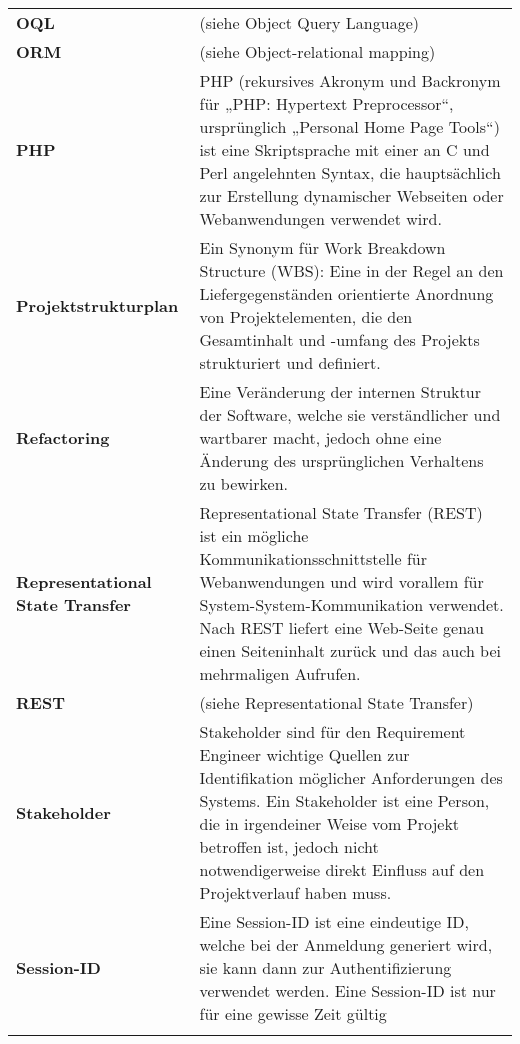 \begin{longtable}{>{\raggedright}m{3cm}m{11cm}}
	\textbf{OQL}&
	(siehe Object Query Language)\\ \addlinespace

	\textbf{ORM}&
	(siehe Object-relational mapping)\\ \addlinespace

	\textbf{PHP}&
	PHP (rekursives Akronym und Backronym für „PHP: Hypertext Preprocessor“, ursprünglich „Personal Home Page Tools“) ist eine Skriptsprache mit einer an C und Perl angelehnten Syntax, die hauptsächlich zur Erstellung dynamischer Webseiten oder Webanwendungen verwendet wird.\cite{wiki_php}\\ \addlinespace	

	\textbf{Projektstrukturplan}&
	Ein Synonym für Work Breakdown Structure (WBS): Eine in der Regel an den Liefergegenständen orientierte Anordnung von Projektelementen, die den Gesamtinhalt und -umfang des Projekts strukturiert und definiert.\cite{proj_mgmt_book}\\ \addlinespace	

	\textbf{Refactoring}&
	Eine Veränderung der internen Struktur der Software, welche sie verständlicher und wartbarer macht, jedoch ohne eine Änderung des ursprünglichen Verhaltens zu bewirken.\cite{feathers2004working}\\ \addlinespace		

	\textbf{Representational State Transfer}&
	Representational State Transfer (REST) ist ein mögliche Kommunikationsschnittstelle für Webanwendungen und wird vorallem für System-System-Kommunikation verwendet. Nach REST liefert eine Web-Seite genau einen Seiteninhalt zurück und das auch bei mehrmaligen Aufrufen.\\ \addlinespace

	\textbf{REST}&
	(siehe Representational State Transfer)\\ \addlinespace

	\textbf{Stakeholder}&
	 Stakeholder sind für den Requirement Engineer wichtige Quellen zur Identifikation möglicher Anforderungen des Systems.\cite{req_eng_book} Ein Stakeholder ist eine Person, die in irgendeiner Weise vom Projekt betroffen ist, jedoch nicht notwendigerweise direkt Einfluss auf den Projektverlauf haben muss.\\ \addlinespace		

	\textbf{Session-ID}&
	Eine Session-ID ist eine eindeutige ID, welche bei der Anmeldung generiert wird, sie kann dann zur Authentifizierung verwendet werden. Eine Session-ID ist nur für eine gewisse Zeit gültig \\ \addlinespace		

\end{longtable}

